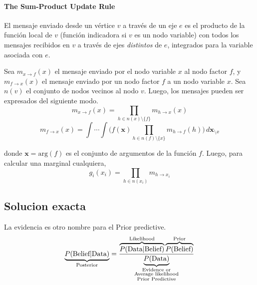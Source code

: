 \documentclass[article]{jss}
\newcommand\hfrac[2]{\genfrac{}{}{0pt}{}{#1}{#2}} %
\begin{document}
\paragraph{The Sum-Product Update Rule} El mensaje enviado desde un v\'ertice $v$ a trav\'es de un eje $e$ es el producto de la funci\'on local de $v$ (funci\'on indicadora si $v$ es un nodo variable) con todos los mensajes recibidos en $v$ a trav\'es de ejes \emph{distintos} de $e$, integrados para la variable asociada con $e$.

\vspace{0.3cm}

Sea $m_{x \rightarrow f}(x)$ el mensaje enviado por el nodo variable $x$ al nodo factor $f$, y $m_{f \rightarrow x}(x)$ el mensaje enviado por un nodo factor $f$ a un nodo variable $x$.
Sea $n(v)$ el conjunto de nodos vecinos al nodo $v$.
Luego, los mensajes pueden ser expresados del siguiente modo.
\begin{equation}\label{eq:m_v_f} 
m_{x \rightarrow f}(x) = \prod_{h \in n(x) \setminus \{f\} } m_{h \rightarrow x}(x)
\end{equation}
\begin{equation}\label{eq:m_f_v}  
m_{f \rightarrow x}(x) = \int \cdots \int \Big( f(\bm{x}) \prod_{h \in n(f) \setminus \{x\} } m_{h \rightarrow f}(h) \Big) \,  d\bm{x}_{\setminus x}
\end{equation}

donde $\bm{x} = \text{arg}(f)$ es el conjunto de argumentos de la funci\'on $f$. 
Luego, para calcular una marginal cualquiera,
\begin{equation}\label{eq:marginal}
g_i(x_i) = \prod_{h \in n(x_i)} m_{h \rightarrow x_i}
\end{equation}


 
\subsection{Solucion exacta}



La evidencia es otro nombre para el Prior predictive.
%
\begin{equation*}
\underbrace{P(\text{Belief}|\text{Data})}_{\text{\scriptsize Posterior}} = \frac{\overbrace{P(\text{Data}|\text{Belief})}^{\text{\scriptsize Likelihood}} \overbrace{P(\text{Belief})}^{\text{\scriptsize Prior}} }{\underbrace{P(\text{Data})}_{\hfrac{\hfrac{\text{\scriptsize Evidence or}}{\text{\scriptsize Average likelihood}}}{\text{\scriptsize Prior Predictive}} } }
\end{equation*}
\end{document}
